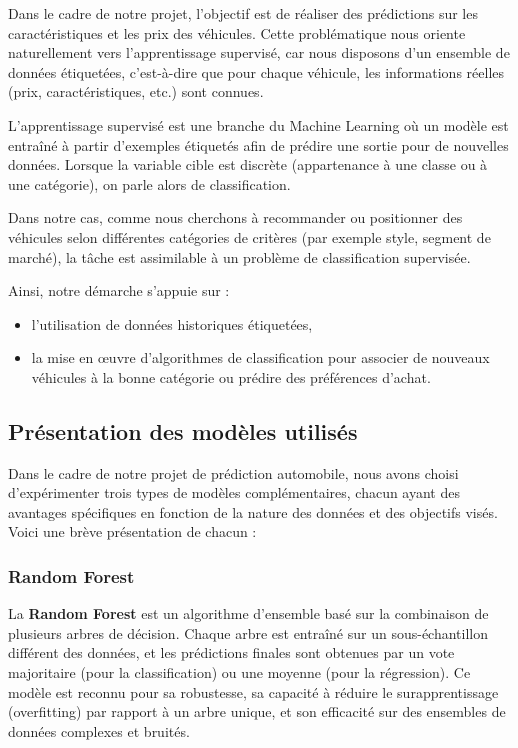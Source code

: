 \documentclass[12pt]{report}
\begin{document}
Dans le cadre de notre projet, l'objectif est de réaliser des prédictions sur les caractéristiques et les prix des véhicules. Cette problématique nous oriente naturellement vers l'apprentissage supervisé, car nous disposons d'un ensemble de données étiquetées, c'est-à-dire que pour chaque véhicule, les informations réelles (prix, caractéristiques, etc.) sont connues.

L'apprentissage supervisé est une branche du Machine Learning où un modèle est entraîné à partir d'exemples étiquetés afin de prédire une sortie pour de nouvelles données. Lorsque la variable cible est discrète (appartenance à une classe ou à une catégorie), on parle alors de classification.

Dans notre cas, comme nous cherchons à recommander ou positionner des véhicules selon différentes catégories de critères (par exemple style, segment de marché), la tâche est assimilable à un problème de classification supervisée.

Ainsi, notre démarche s'appuie sur :
\begin{itemize}
    \item l'utilisation de données historiques étiquetées,
    \item la mise en œuvre d'algorithmes de classification pour associer de nouveaux véhicules à la bonne catégorie ou prédire des préférences d'achat.
\end{itemize}

\subsection{Présentation des modèles utilisés}

Dans le cadre de notre projet de prédiction automobile, nous avons choisi d'expérimenter trois types de modèles complémentaires, chacun ayant des avantages spécifiques en fonction de la nature des données et des objectifs visés. Voici une brève présentation de chacun :

\subsubsection{Random Forest}

La \textbf{Random Forest} est un algorithme d'ensemble basé sur la combinaison de plusieurs arbres de décision. Chaque arbre est entraîné sur un sous-échantillon différent des données, et les prédictions finales sont obtenues par un vote majoritaire (pour la classification) ou une moyenne (pour la régression). Ce modèle est reconnu pour sa robustesse, sa capacité à réduire le surapprentissage (overfitting) par rapport à un arbre unique, et son efficacité sur des ensembles de données complexes et bruités.
\end{document}
